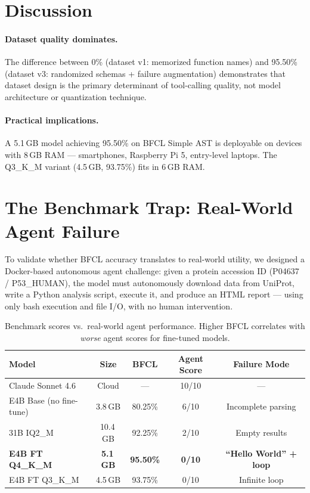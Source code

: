 \documentclass[11pt,a4paper]{article}
\begin{document}
\section{Discussion}

\paragraph{Dataset quality dominates.} The difference between 0\% (dataset v1: memorized function names) and 95.50\% (dataset v3: randomized schemas + failure augmentation) demonstrates that dataset design is the primary determinant of tool-calling quality, not model architecture or quantization technique.

\paragraph{Practical implications.} A 5.1\,GB model achieving 95.50\% on BFCL Simple AST is deployable on devices with 8\,GB RAM --- smartphones, Raspberry Pi 5, entry-level laptops. The Q3\_K\_M variant (4.5\,GB, 93.75\%) fits in 6\,GB RAM.

\section{The Benchmark Trap: Real-World Agent Failure}

To validate whether BFCL accuracy translates to real-world utility, we designed a Docker-based autonomous agent challenge: given a protein accession ID (P04637 / P53\_HUMAN), the model must autonomously download data from UniProt, write a Python analysis script, execute it, and produce an HTML report --- using only bash execution and file I/O, with no human intervention.

\begin{table}[H]
\centering
\caption{Benchmark scores vs.\ real-world agent performance. Higher BFCL correlates with \emph{worse} agent scores for fine-tuned models.}
\label{tab:trap}
\begin{tabular}{lcccc}
\toprule
\textbf{Model} & \textbf{Size} & \textbf{BFCL} & \textbf{Agent Score} & \textbf{Failure Mode} \\
\midrule
Claude Sonnet 4.6 & Cloud & --- & 10/10 & --- \\
E4B Base (no fine-tune) & 3.8\,GB & 80.25\% & 6/10 & Incomplete parsing \\
31B IQ2\_M & 10.4\,GB & 92.25\% & 2/10 & Empty results \\
\textbf{E4B FT Q4\_K\_M} & \textbf{5.1\,GB} & \textbf{95.50\%} & \textbf{0/10} & \textbf{``Hello World'' + loop} \\
E4B FT Q3\_K\_M & 4.5\,GB & 93.75\% & 0/10 & Infinite loop \\
\bottomrule
\end{tabular}
\end{table}
\end{document}
